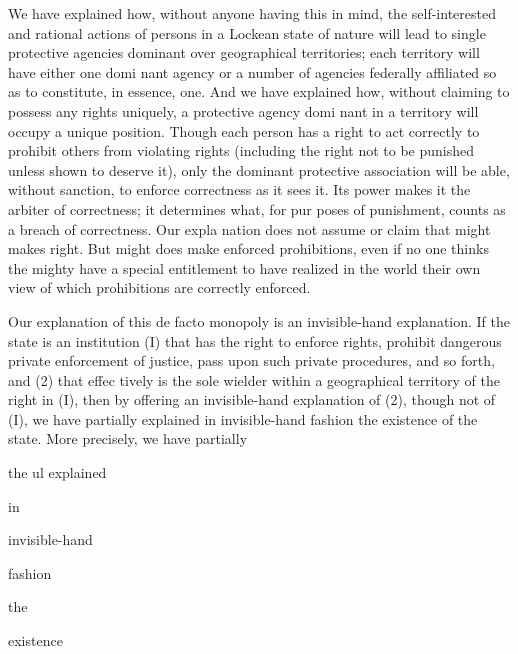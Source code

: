 \documentclass[11pt,openany]{book}
\begin{document}
We have explained how, without anyone having this in mind, the self-interested and rational actions of persons in a Lockean state of nature will lead to single protective agencies dominant over geographical territories; each territory will have either one domi nant agency or a number of agencies federally affiliated so as to constitute, in essence, one. And we have explained how, without claiming to possess any rights uniquely, a protective agency domi nant in a territory will occupy a unique position. Though each person has a right to act correctly to prohibit others from violating rights (including the right not to be punished unless shown to deserve it), only the dominant protective association will be able, without sanction, to enforce correctness as it sees it. Its power makes it the arbiter of correctness; it determines what, for pur poses of punishment, counts as a breach of correctness. Our expla nation does not assume or claim that might makes right. But might does make enforced prohibitions, even if no one thinks the mighty have a special entitlement to have realized in the world their own view of which prohibitions are correctly enforced. 

Our explanation of this de facto monopoly is an invisible-hand explanation. If the state is an institution (I) that has the right to enforce rights, prohibit dangerous private enforcement of justice, pass upon such private procedures, and so forth, and (2) that effec tively is the sole wielder within a geographical territory of the right in (I), then by offering an invisible-hand explanation of (2), though not of (I), we have partially explained in invisible-hand fashion the existence of the state. More precisely, we have partially 

the ul explained 

in 

invisible-hand 

fashion 

the 

existence 
\end{document}
